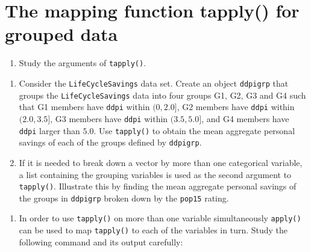 \documentclass[
]{book}
\providecommand{\tightlist}{%
  \setlength{\itemsep}{0pt}\setlength{\parskip}{0pt}}
\begin{document}
\section{The mapping function tapply() for grouped data}\label{the-mapping-function-tapply-for-grouped-data}

\begin{enumerate}
\def\labelenumi{(\alph{enumi})}
\tightlist
\item
  Study the arguments of \texttt{tapply()}.
\end{enumerate}

\begin{enumerate}
\def\labelenumi{(\alph{enumi})}
\setcounter{enumi}{1}
\item
  Consider the \texttt{LifeCycleSavings} data set. Create an object \texttt{ddpigrp} that groups the \texttt{LifeCycleSavings} data into four groups G1, G2, G3 and G4 such that G1 members have \texttt{ddpi} within \((0, 2.0]\), G2 members have \texttt{ddpi} within \((2.0, 3.5]\), G3 members have \texttt{ddpi} within \((3.5, 5.0]\), and G4 members have \texttt{ddpi} larger than \(5.0\). Use \texttt{tapply()} to obtain the mean aggregate personal savings of each of the groups defined by \texttt{ddpigrp}.
\item
  If it is needed to break down a vector by more than one categorical variable, a list containing the grouping variables is used as the second argument to \texttt{tapply()}. Illustrate this by finding the mean aggregate personal savings of the groups in \texttt{ddpigrp} broken down by the \texttt{pop15} rating.
\end{enumerate}

\begin{enumerate}
\def\labelenumi{(\alph{enumi})}
\setcounter{enumi}{3}
\tightlist
\item
  In order to use \texttt{tapply()} on more than one variable simultaneously \texttt{apply()} can be used to map \texttt{tapply()} to each of the variables in turn. Study the following command and its output carefully:
\end{enumerate}
\end{document}
